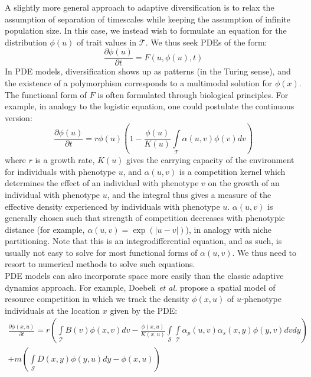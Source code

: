 A slightly more general approach to adaptive diversification is to relax the assumption of separation of timescales while keeping the assumption of infinite population size. In this case, we instead wish to formulate an equation for the distribution $\phi(u)$ of trait values in $\mathcal{T}$. We thus seek PDEs of the form:
\begin{equation*}
    \frac{\partial \phi(u)}{\partial t} = F(u,\phi(u),t)
\end{equation*}
In PDE models, diversification shows up as patterns (in the Turing sense), and the existence of a polymorphism corresponds to a multimodal solution for $\phi(x)$. The functional form of $F$ is often formulated through biological principles. For example, in analogy to the logistic equation, one could postulate the continuous version:
\begin{equation}
\label{cts_logistic}
\frac{\partial \phi(u)}{\partial t} = r\phi(u)\left(1 - \frac{\phi(u)}{K(u)}\int\limits_{\mathcal{T}}\alpha(u,v)\phi(v)dv\right)
\end{equation}
where $r$ is a growth rate, $K(u)$ gives the carrying capacity of the environment for individuals with phenotype $u$, and $\alpha(u,v)$ is a competition kernel which determines the effect of an individual with phenotype $v$ on the growth of an individual with phenotype $u$, and the integral thus gives a measure of the effective density experienced by individuals with phenotype $u$. $\alpha(u,v)$ is generally chosen such that strength of competition decreases with phenotypic distance (for example, $\alpha(u,v) = \exp(|u-v|)$), in analogy with niche partitioning. Note that this is an integrodifferential equation, and as such, is usually not easy to solve for most functional forms of $\alpha(u,v)$. We thus need to resort to numerical methods to solve such equations. \\
PDE models can also incorporate space more easily than the classic adaptive dynamics approach. For example, Doebeli \textit{et al.} propose a spatial model of resource competition in which we track the density $\phi(x,u)$ of $u$-phenotype individuals at the location $x$ given by the PDE:
\begin{equation}
\begin{split}
\label{spatial_PDE}
\frac{\partial \phi(x,u)}{\partial t} = r\left(\int\limits_{\mathcal{T}}B(v)\phi(x,v)dv - \frac{\phi(x,u)}{K(x,u)}\int\limits_{\mathcal{S}}\int\limits_{\mathcal{T}}\alpha_p(u,v)\alpha_s(x,y)\phi(y,v)dvdy\right) \\ +m\left(\int\limits_{\mathcal{S}}D(x,y)\phi(y,u)dy - \phi(x,u)\right)
\end{split}
\end{equation}
